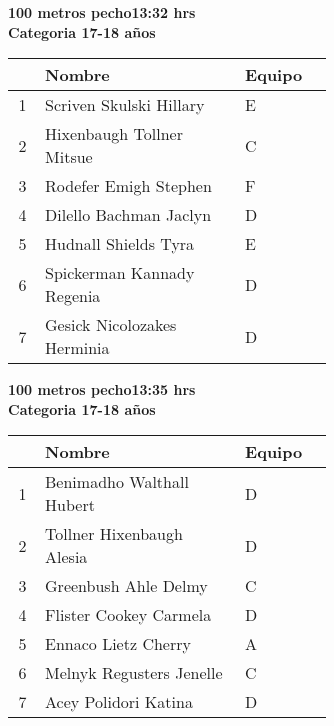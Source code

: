 \begin{minipage}{0.95\linewidth}\vspace{0.5cm} 
\begin{flushleft}
\textbf{
\hspace{-0.15cm}100 metros pecho\hspace{1.5cm}13:32 hrs \\Categoria 17-18 años}\vspace{-0.2cm} 
\end{flushleft}
\begin{tabular}{cp{0.63\linewidth}l}
\hline
& \textbf{Nombre} & \textbf{Equipo} \\ \hline
1 & Scriven Skulski Hillary & E \\ 
2 & Hixenbaugh Tollner Mitsue & C \\ 
3 & Rodefer Emigh Stephen & F \\ 
4 & Dilello Bachman Jaclyn & D \\ 
5 & Hudnall Shields Tyra & E \\ 
6 & Spickerman Kannady Regenia & D \\ 
7 & Gesick Nicolozakes Herminia & D \\ 
\end{tabular}
\end{minipage}
\begin{minipage}{0.95\linewidth}\vspace{0.5cm} 
\begin{flushleft}
\textbf{
\hspace{-0.15cm}100 metros pecho\hspace{1.5cm}13:35 hrs \\Categoria 17-18 años}\vspace{-0.2cm} 
\end{flushleft}
\begin{tabular}{cp{0.63\linewidth}l}
\hline
& \textbf{Nombre} & \textbf{Equipo} \\ \hline
1 & Benimadho Walthall Hubert & D \\ 
2 & Tollner Hixenbaugh Alesia & D \\ 
3 & Greenbush Ahle Delmy & C \\ 
4 & Flister Cookey Carmela & D \\ 
5 & Ennaco Lietz Cherry & A \\ 
6 & Melnyk Regusters Jenelle & C \\ 
7 & Acey Polidori Katina & D \\ 
\end{tabular}
\end{minipage}
